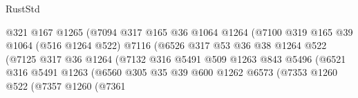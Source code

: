 \begin{lexlean}{RustStd}
\begin{coremodule}
                                      @321
                                      @167
                                      @1265
                                      (@7094
                                        @317
                                        @165
                                        @36
                                        @1064
                                        @1264
                                        (@7100
                                          @319
                                          @165
                                          @39
                                          @1064
                                          (@516 @1264 @522)
                                          @7116
                                          (@6526
                                            @317
                                            @53
                                            @36
                                            @38
                                            @1264
                                            @522
                                            (@7125
                                              @317
                                              @36
                                              @1264
                                              (@7132
                                                @316
                                                @5491
                                                @509
                                                @1263
                                                @843
                                                @5496
                                                (@6521
                                                  @316
                                                  @5491
                                                  @1263
                                                  (@6560
                                                    @305
                                                    @35
                                                    @39
                                                    @600
                                                    @1262
                                                    @6573
                                                    (@7353
                                                      @1260
                                                      @522
                                                      (@7357
                                                        @1260
                                                        (@7361

\end{coremodule}
\end{lexlean}
